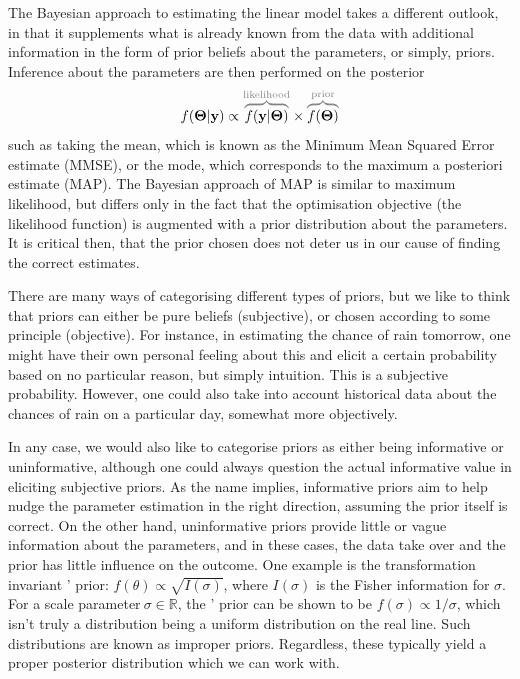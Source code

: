 The Bayesian approach to estimating the linear model takes a different outlook, in that it supplements what is already known from the data with additional information in the form of prior beliefs about the parameters, or simply, priors. Inference about the parameters are then performed on the posterior
\[
	f(\boldsymbol\Theta|\mathbf y) \propto {\color{gray}\overbrace{\color{black}f(\mathbf y|\boldsymbol\Theta)}^{\text{likelihood}}} \times {\color{gray}\overbrace{\color{black}f(\boldsymbol\Theta)}^{\text{prior}}}
\]
such as taking the mean, which is known as the Minimum Mean Squared Error estimate (MMSE), or the mode, which corresponds to the maximum a posteriori estimate (MAP). The Bayesian approach of MAP is similar to maximum likelihood, but differs only in the fact that the optimisation objective (the likelihood function) is augmented with a prior distribution about the parameters. It is critical then, that the prior chosen does not deter us in our cause of finding the correct estimates.

There are many ways of categorising different types of priors, but we like to think that priors can either be pure beliefs (subjective), or chosen according to some principle (objective). For instance, in estimating the chance of rain tomorrow, one might have their own personal feeling about this and elicit a certain probability based on no particular reason, but simply intuition. This is a subjective probability. However, one could also take into account historical data about the chances of rain on a particular day, somewhat more objectively. 

In any case, we would also like to categorise priors as either being informative or uninformative, although one could always question the actual informative value in eliciting subjective priors. As the name implies, informative priors aim to help nudge the parameter estimation in the right direction, assuming the prior itself is correct. On the other hand, uninformative priors provide little or vague information about the parameters, and in these cases, the data take over and the prior has little influence on the outcome. One example is the transformation invariant \citeauthor{Jeffreys1946}' \citeyearpar{Jeffreys1946} prior: $f(\theta) \propto  \sqrt{I(\sigma)}$, where $I(\sigma)$ is the Fisher information for $\sigma$. For a scale parameter\footnotemark $\ \sigma \in \mathbb{R}$, the \citeauthor{Jeffreys1946}' prior can be shown to be $f(\sigma) \propto 1/\sigma$, which isn't truly a distribution being a uniform distribution on the real line. Such distributions are known as improper priors. Regardless, these typically yield a proper posterior distribution which we can work with.

